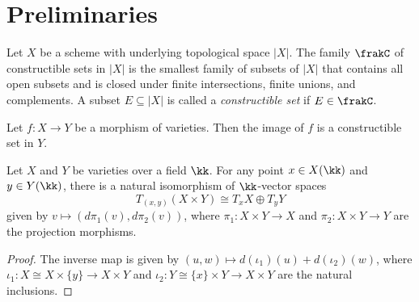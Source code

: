\section{Preliminaries}

\begin{definition}\label{def:constructible_set}
    Let \(X\) be a scheme with underlying topological space \(|X|\).
    The family \(\frakC\) of constructible sets in \(|X|\) is the smallest family of subsets of \(|X|\) that contains all open subsets and is closed under finite intersections, finite unions, and complements.
    A subset \(E \subseteq |X|\) is called a \emph{constructible set} if \(E \in \frakC\).
\end{definition}

\begin{theorem}\label{thm:Chavellaye_constructible_theorem}
    Let \(f: X \to Y\) be a morphism of varieties.
    Then the image of \(f\) is a constructible set in \(Y\).
\end{theorem}

\begin{lemma}\label{lem:tangent_space_of_product}
    Let \(X\) and \(Y\) be varieties over a field \(\kk\).
    For any point \(x \in X(\kk)\) and \(y \in Y(\kk)\), there is a natural isomorphism of \(\kk\)-vector spaces
    \[
        T_{(x,y)}(X \times Y) \cong T_x X \oplus T_y Y
    \]
    given by \(v \mapsto (d\pi_1(v), d\pi_2(v))\), where \(\pi_1: X \times Y \to X\) and \(\pi_2: X \times Y \to Y\) are the projection morphisms.
\end{lemma}
\begin{proof}
    The inverse map is given by \((u,w) \mapsto d(\iota_1)(u) + d(\iota_2)(w)\), where \(\iota_1: X \cong X \times \{y\} \to X \times Y\) and \(\iota_2: Y \cong \{x\} \times Y \to X \times Y\) are the natural inclusions.
\end{proof}
